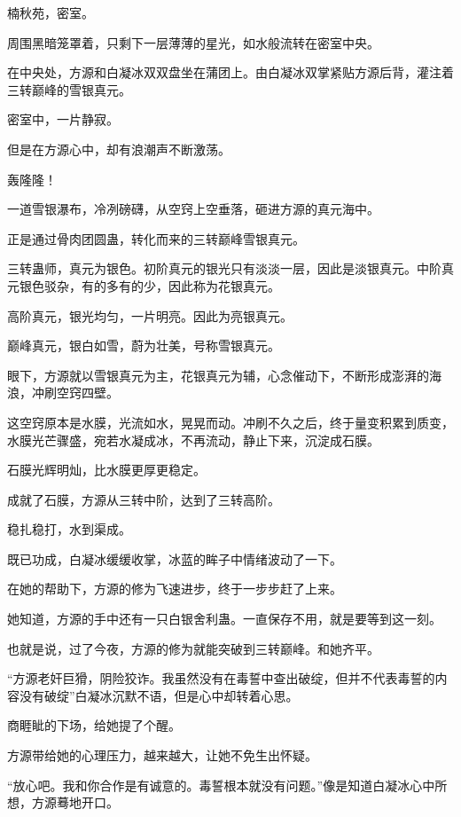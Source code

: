 
\begin{this_body}

楠秋苑，密室。

周围黑暗笼罩着，只剩下一层薄薄的星光，如水般流转在密室中央。

在中央处，方源和白凝冰双双盘坐在蒲团上。由白凝冰双掌紧贴方源后背，灌注着三转巅峰的雪银真元。

密室中，一片静寂。

但是在方源心中，却有浪潮声不断激荡。

轰隆隆！

一道雪银瀑布，冷冽磅礴，从空窍上空垂落，砸进方源的真元海中。

正是通过骨肉团圆蛊，转化而来的三转巅峰雪银真元。

三转蛊师，真元为银色。初阶真元的银光只有淡淡一层，因此是淡银真元。中阶真元银色驳杂，有的多有的少，因此称为花银真元。

高阶真元，银光均匀，一片明亮。因此为亮银真元。

巅峰真元，银白如雪，蔚为壮美，号称雪银真元。

眼下，方源就以雪银真元为主，花银真元为辅，心念催动下，不断形成澎湃的海浪，冲刷空窍四壁。

这空窍原本是水膜，光流如水，晃晃而动。冲刷不久之后，终于量变积累到质变，水膜光芒骤盛，宛若水凝成冰，不再流动，静止下来，沉淀成石膜。

石膜光辉明灿，比水膜更厚更稳定。

成就了石膜，方源从三转中阶，达到了三转高阶。

稳扎稳打，水到渠成。

既已功成，白凝冰缓缓收掌，冰蓝的眸子中情绪波动了一下。

在她的帮助下，方源的修为飞速进步，终于一步步赶了上来。

她知道，方源的手中还有一只白银舍利蛊。一直保存不用，就是要等到这一刻。

也就是说，过了今夜，方源的修为就能突破到三转巅峰。和她齐平。

“方源老奸巨猾，阴险狡诈。我虽然没有在毒誓中查出破绽，但并不代表毒誓的内容没有破绽”白凝冰沉默不语，但是心中却转着心思。

商睚眦的下场，给她提了个醒。

方源带给她的心理压力，越来越大，让她不免生出怀疑。

“放心吧。我和你合作是有诚意的。毒誓根本就没有问题。”像是知道白凝冰心中所想，方源蓦地开口。


\end{this_body}
